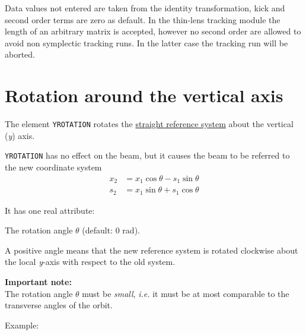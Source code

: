 Data values not entered are taken from the identity transformation, kick
and second order terms are zero as default. In the thin-lens tracking
module the length of an arbitrary matrix is accepted, however no second
order are allowed to avoid non symplectic tracking runs. In the latter
case the tracking run will be aborted.


\section{Rotation around the vertical axis}
\label{sec:yrotation}

The element \texttt{YROTATION} rotates the
\hyperref[subsec:local-straight]{straight reference system} about the
vertical (\textit{y}) axis.


\texttt{YROTATION} has no effect on the beam, but it
causes the beam to be referred to the new coordinate system  \\
\begin{equation}\begin{split}
x_2 &= x_1 \cos\theta - s_1 \sin\theta \\
s_2 &= x_1 \sin\theta + s_1 \cos\theta
\end{split}\end{equation}

It has one real attribute: 
\begin{madlist}
    The rotation angle $\theta$ (default: 0 rad).  
\end{madlist}

A positive angle means that the new reference system is rotated
clockwise about the local \textit{y}-axis with respect to the old system. 

\textbf{Important note:} \\
The rotation angle $\theta$ must be \emph{small}, \textsl{i.e.} it must be at
most comparable to the transverse angles of the orbit. 

Example: 

